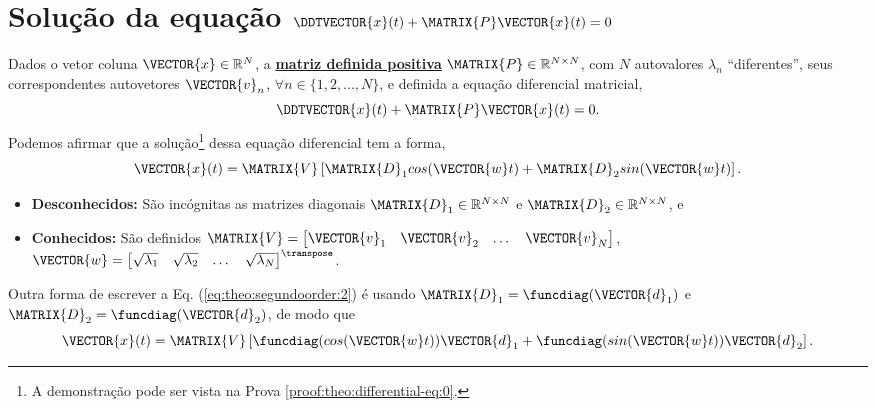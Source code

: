 \section{ Solução da equação $\DDTVECTOR{x}(t) + \MATRIX{P} \VECTOR{x}(t)=0$ }

\begin{theorem}[Equação 
$\DDTVECTOR{x}(t) + \MATRIX{P} \VECTOR{x}(t)=0$ com matriz $\MATRIX{P}$ definida positiva:]
\label{theo:differential-eq:0}
Dados o vetor coluna $\VECTOR{x} \in \mathbb{R}^N$, 
a \hyperref[def:positivematrix0]{\textbf{matriz definida positiva}} $\MATRIX{P} \in \mathbb{R}^{N\times N}$,
com $N$ autovalores $\lambda_n$ ``diferentes'', seus correspondentes autovetores $\VECTOR{v}_n$,
$\forall n \in \{1, 2, ..., N\}$, 
e definida a equação diferencial matricial,
\begin{equation}\label{eq:theo:segundoorder:1}
\DDTVECTOR{x}(t) + \MATRIX{P} \VECTOR{x}(t)=0.
\end{equation}
Podemos afirmar que a solução\footnote{A
demonstração pode ser vista na Prova \ref{proof:theo:differential-eq:0}.} dessa 
equação diferencial tem a forma,
\begin{equation}\label{eq:theo:segundoorder:2}
 \VECTOR{x}(t)= \MATRIX{V}\left[\MATRIX{D}_1 cos(\VECTOR{w}t) + \MATRIX{D}_2 sin(\VECTOR{w}t) \right].
\end{equation}
\begin{itemize}
\item \textbf{Desconhecidos:} São incógnitas as matrizes diagonais $\MATRIX{D}_1 \in \mathbb{R}^{N \times N}$ e $\MATRIX{D}_2  \in \mathbb{R}^{N \times N}$, e
\item  \textbf{Conhecidos:} São definidos $\MATRIX{V}=
\begin{bmatrix}
\VECTOR{v}_1 & \VECTOR{v}_2 & \dots & \VECTOR{v}_N
\end{bmatrix}$, 
$\VECTOR{w}=
\begin{bmatrix}
\sqrt{\lambda_1} & \sqrt{\lambda_2} & \dots & \sqrt{\lambda_N}
\end{bmatrix}^{\transpose}$.
\end{itemize}
\end{theorem}

\begin{corollary}
\label{coro:differential-eq:0}
Outra forma de escrever a Eq. (\ref{eq:theo:segundoorder:2}) é usando $\MATRIX{D}_1=\funcdiag(\VECTOR{d}_1)$ e $\MATRIX{D}_2=\funcdiag(\VECTOR{d}_2)$, de modo que
\begin{equation}\label{eq:coro:segundoorder:1}
 \VECTOR{x}(t)= \MATRIX{V}\left[ \funcdiag(cos(\VECTOR{w}t))\VECTOR{d}_1 +  \funcdiag(sin(\VECTOR{w}t)) \VECTOR{d}_2 \right].
\end{equation}
\end{corollary}

